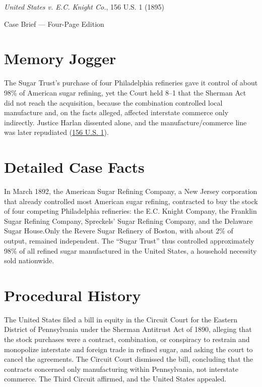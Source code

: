 \documentclass[12pt]{article}
\begin{document}
\begin{center}
{\LARGE \textit{United States v. E.C. Knight Co.}, 156 U.S. 1 (1895)\par}
\vspace{0.8em}
{\large Case Brief --- Four-Page Edition\par}
\end{center}
\vspace{1em}

\section{Memory Jogger}

The Sugar Trust's purchase of four Philadelphia refineries gave it control of about 98\% of American sugar refining, yet the Court held 8--1 that the Sherman Act did not reach the acquisition, because the combination controlled local manufacture and, on the facts alleged, affected interstate commerce only indirectly. Justice Harlan dissented alone, and the manufacture/commerce line was later repudiated (\href{https://supreme.justia.com/cases/federal/us/156/1/}{156 U.S. 1}).

\section{Detailed Case Facts}

In March 1892, the American Sugar Refining Company, a New Jersey corporation that already controlled most American sugar refining, contracted to buy the stock of four competing Philadelphia refineries: the E.C. Knight Company, the Franklin Sugar Refining Company, Spreckels' Sugar Refining Company, and the Delaware Sugar House.Only the Revere Sugar Refinery of Boston, with about 2\% of output, remained independent. The ``Sugar Trust'' thus controlled approximately 98\% of all refined sugar manufactured in the United States, a household necessity sold nationwide.

\section{Procedural History}

The United States filed a bill in equity in the Circuit Court for the Eastern District of Pennsylvania under the Sherman Antitrust Act of 1890, alleging that the stock purchases were a contract, combination, or conspiracy to restrain and monopolize interstate and foreign trade in refined sugar, and asking the court to cancel the agreements. The Circuit Court dismissed the bill, concluding that the contracts concerned only manufacturing within Pennsylvania, not interstate commerce. The Third Circuit affirmed, and the United States appealed.
\end{document}
